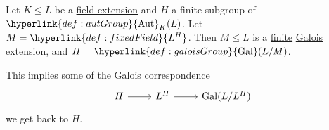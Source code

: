 \documentclass{article}
\DeclareMathOperator{\Aut}{Aut}
\DeclareMathOperator{\Gal}{Gal}
\begin{document}

\begin{nthm}\label{thm:3.3}
    Let $K \leq L$ be a \hyperlink{def:fieldExt}{field extension} and $H$ a finite subgroup of $\hyperlink{def:autGroup}{\Aut}_K(L)$.
    Let $M = \hyperlink{def:fixedField}{L^H}$.
    Then $M \leq L$ is a \hyperlink{def:degreeOfFieldExt}{finite} \hyperlink{def:galoisExt}{Galois} extension, and $H = \hyperlink{def:galoisGroup}{\Gal}(L/M)$.
\end{nthm}

\begin{remark}
    This implies some of the Galois correspondence
    \begin{equation*}
        \begin{tikzcd}
            H \arrow[r] & L^H \arrow[r] & \Gal(L / L^H)
        \end{tikzcd}
    \end{equation*}
    we get back to $H$.
\end{remark}
\end{document}
